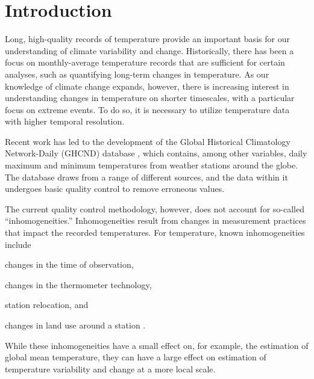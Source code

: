 \section{Introduction}\label{sec:climate_intro}

Long, high-quality records of temperature provide an important basis for our understanding of climate variability and change. Historically, there has been a focus on monthly-average temperature records that are sufficient for certain analyses, such as quantifying long-term changes in temperature. As our knowledge of climate change expands, however, there is increasing interest in understanding changes in temperature on shorter timescales, with a particular focus on extreme events. To do so, it is necessary to utilize temperature data with higher temporal resolution. 

Recent work has led to the development of the Global Historical Climatology Network-Daily (GHCND) database \citep{menne2012overview}, which contains, among other variables, daily maximum and minimum temperatures from weather stations around the globe. The database draws from a range of different sources, and the data within it undergoes basic quality control to remove erroneous values. 

The current quality control methodology, however, does not account for so-called ``inhomogeneities.'' Inhomogeneities result from changes in measurement practices that impact the recorded temperatures. For temperature, known inhomogeneities include 
\begin{flatlist}
    \item changes in the time of observation, 
    \item changes in the thermometer technology, 
    \item station relocation, and 
    \item changes in land use around a station \citep{menne2009us}.
\end{flatlist}
While these inhomogeneities have a small effect on, for example, the estimation of global mean temperature, they can have a large effect on estimation of temperature variability and change at a more local scale.

